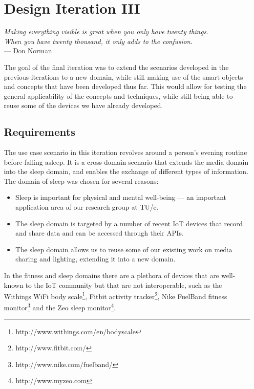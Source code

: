 \chapter{Design Iteration III}
\label{DesignIteration3}

\begin{flushright}{\slshape    
Making everything visible is great when you only have twenty things. \\
When you have twenty thousand, it only adds to the confusion.} \\ \medskip
    ---  Don Norman \cite{Norman1999}
\end{flushright}


The goal of the final iteration was to extend the scenarios developed in the previous iterations to a new domain, while still making use of the smart objects and concepts that have been developed thus far. This would allow for testing the general applicability of the concepts and techniques, while still being able to reuse some of the devices we have already developed.

\section{Requirements}

The use case scenario in this iteration revolves around a person's evening routine before falling asleep. It is a cross-domain scenario that extends the media domain into the sleep domain, and enables the exchange of different types of information. The domain of sleep was chosen for several reasons:

\begin{itemize}
\item Sleep is important for physical and mental well-being --- an important application area of our research group at TU/e.
\item The sleep domain is targeted by a number of recent \ac{IoT} devices that record and share data and can be accessed through their \acp{API}.
\item 	The sleep domain allows us to reuse some of our existing work on media sharing and lighting, extending it into a new domain.
\end{itemize}

In the fitness and sleep domains there are a plethora of devices that are well-known to the \ac{IoT} community but that are not interoperable, such as the Withings WiFi body scale\footnote{http://www.withings.com/en/bodyscale}, Fitbit activity tracker\footnote{http://www.fitbit.com/}, Nike FuelBand fitness monitor\footnote{http://www.nike.com/fuelband/} and the Zeo sleep monitor\footnote{http://www.myzeo.com}.

